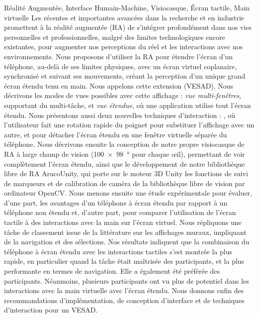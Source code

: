 \begin{sommaire}{Réalité Augmentée, Interface Humain-Machine, Visiocasque, Écran tactile, Main virtuelle}
  Les récentes et importantes avancées dans la recherche et en industrie promettent à la réalité augmentée (RA) de s'intégrer profondément dans nos vies personnelles et professionnelles, malgré des limites technologiques encore existantes, pour augmenter nos perceptions du réel et les interactions avec nos environnements.
  Nous proposons d'utiliser la RA pour étendre l'écran d'un téléphone, au-delà de ses limites physiques, avec un écran virtuel coplanaire, synchronisé et suivant ses mouvements, créant la perception d'un unique grand écran étendu tenu en main. Nous appelons cette extension  (VESAD).
  Nous décrivons les modes de vues possibles avec cette affichage : \emph{vue multi-fenêtres}, supportant du multi-tâche, et \emph{vue étendue}, où une application utilise tout l'écran étendu.
  Nous présentons aussi deux nouvelles techniques d'interaction : , où l'utilisateur fait une rotation rapide du poignet pour substituer l'affichage avec un autre, et  pour détacher l'écran étendu en une fenêtre virtuelle séparée du téléphone.
  Nous décrivons ensuite la conception de notre propre visiocasque de RA à large champ de vision (\SI{100x98}{\degree} pour chaque œil), permettant de voir complètement l'écran étendu, ainsi que le développement de notre bibliothèque libre de RA ArucoUnity, qui porte sur le moteur 3D Unity les fonctions de suivi de marqueurs et de calibration de caméra de la bibliothèque libre de vision par ordinateur OpenCV.
  Nous menons ensuite une étude expérimentale pour évaluer, d'une part, les avantages d'un téléphone à écran étendu par rapport à un téléphone non étendu et, d'autre part, pour comparer l'utilisation de l'écran tactile à des interactions avec la main sur l'écran virtuel. Nous répliquons une tâche de classement issue de la littérature sur les affichages muraux, impliquant de la navigation et des sélections.
  Nos résultats indiquent que la combinaison du téléphone à écran étendu avec les interactions tactiles s'est montrée la plus rapide, en particulier quand la tâche était maîtrisée des participants, et la plus performante en termes de navigation. Elle a également été préférée des participants. Néanmoins, plusieurs participants ont vu plus de potentiel dans les interactions avec la main virtuelle avec l'écran étendu.
  Nous donnons enfin des recommandations d'implémentation, de conception d'interface et de techniques d'interaction pour un VESAD.
\end{sommaire}

